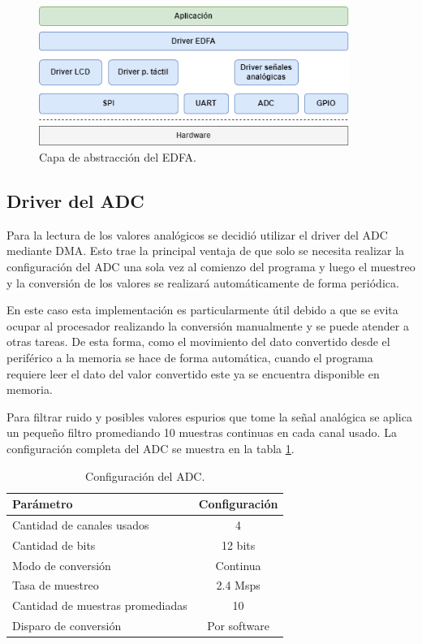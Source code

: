 \begin{figure}[H]
\centering
\includegraphics[width=0.9\textwidth]{./Figures/halamp.png}
\caption{Capa de abstracción del EDFA.}
\label{fig:halAmp}
\end{figure}

\subsection{Driver del ADC}

Para la lectura de los valores analógicos se decidió utilizar el driver del ADC mediante DMA. Esto trae la principal ventaja de que solo se necesita realizar la configuración del ADC una sola vez al comienzo del programa y luego el muestreo y la conversión de los valores se realizará automáticamente de forma periódica.

En este caso esta implementación es particularmente útil debido a que se evita ocupar al procesador realizando la conversión manualmente y se puede atender a otras tareas. De esta forma, como el movimiento del dato convertido desde el periférico a la memoria se hace de forma automática, cuando el programa requiere leer el dato del valor convertido este ya se encuentra disponible en memoria.

Para filtrar ruido y posibles valores espurios que tome la señal analógica se aplica un pequeño filtro promediando 10 muestras continuas en cada canal usado. La configuración completa del ADC se muestra en la tabla \ref{tab:configADC}.

\begin{table}[H]
	\centering
	\caption{Configuración del ADC.}
	\begin{tabular}{l c}
		\toprule
		\textbf{Parámetro} & \textbf{Configuración}  \\
		\midrule
		Cantidad de canales usados & 4					\\
		Cantidad de bits		& 12 bits 	 		 \\
		Modo de conversión		& Continua   \\
		Tasa de muestreo		& 2.4 Msps				 \\
		Cantidad de muestras promediadas	& 10 \\
		Disparo de conversión	& Por software \\
		\bottomrule
		\hline
	\end{tabular}
	\label{tab:configADC}
\end{table}

